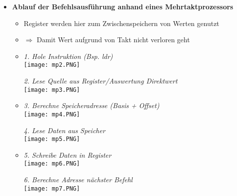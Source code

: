 \begin{itemize}
        \item \textbf{Ablauf der Befehlsausführung anhand eines Mehrtaktprozessors}
            \begin{itemize}
                \item Register werden hier zum Zwischenspeichern von Werten genutzt
                \item[] $\Rightarrow$ Damit Wert aufgrund von Takt nicht verloren geht
                \item[]
                    \begin{minipage}{0.4\textwidth}
                        \textit{1. Hole Instruktion (Bsp. ldr)} \\
                        \texttt{[image: mp2.PNG]}
                    \end{minipage}
                    \begin{minipage}{0.5\textwidth}
                        \textit{2. Lese Quelle aus Register/Auswertung Direktwert} \\
                        \texttt{[image: mp3.PNG]}
                    \end{minipage}
                \item[]
                    \begin{minipage}{0.4\textwidth}
                        \textit{3. Berechne Speicheradresse (Basis + Offset)} \\
                        \texttt{[image: mp4.PNG]}
                    \end{minipage}
                    \begin{minipage}{0.5\textwidth}
                        \textit{4. Lese Daten aus Speicher} \\
                        \texttt{[image: mp5.PNG]}
                    \end{minipage}
                \item[]
                    \begin{minipage}{0.4\textwidth}
                        \textit{5. Schreibe Daten in Register} \\
                        \texttt{[image: mp6.PNG]}
                    \end{minipage}
                    \begin{minipage}{0.5\textwidth}
                        \textit{6. Berechne Adresse nächster Befehl} \\
                        \texttt{[image: mp7.PNG]}

\end{minipage}
\end{itemize}
\end{itemize}
